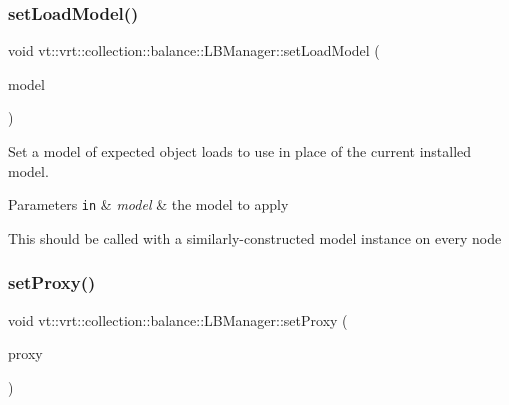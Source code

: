 \mbox{\label{structvt_1_1vrt_1_1collection_1_1balance_1_1_l_b_manager_a57813a70e0395907021a14c9e2bc1916}} 
\subsubsection{\texorpdfstring{set\+Load\+Model()}{setLoadModel()}}
{\footnotesize\ttfamily void vt\+::vrt\+::collection\+::balance\+::\+L\+B\+Manager\+::set\+Load\+Model (\begin{DoxyParamCaption}\item[{std\+::shared\+\_\+ptr$<$ \hyperlink{classvt_1_1vrt_1_1collection_1_1balance_1_1_load_model}{Load\+Model} $>$}]{model }\end{DoxyParamCaption})}



Set a model of expected object loads to use in place of the current installed model. 


\begin{DoxyParams}[1]{Parameters}
\mbox{\tt in}  & {\em model} & the model to apply\\
\hline
\end{DoxyParams}
This should be called with a similarly-\/constructed model instance on every node \mbox{\label{structvt_1_1vrt_1_1collection_1_1balance_1_1_l_b_manager_aacef5b639acd9d984b9bcb79ecb9c6a9}} 
\subsubsection{\texorpdfstring{set\+Proxy()}{setProxy()}}
{\footnotesize\ttfamily void vt\+::vrt\+::collection\+::balance\+::\+L\+B\+Manager\+::set\+Proxy (\begin{DoxyParamCaption}\item[{\hyperlink{structvt_1_1objgroup_1_1proxy_1_1_proxy}{objgroup\+::proxy\+::\+Proxy}$<$ \hyperlink{structvt_1_1vrt_1_1collection_1_1balance_1_1_l_b_manager}{L\+B\+Manager} $>$}]{proxy }\end{DoxyParamCaption})\hspace{0.3cm}{\ttfamily [inline]}}



